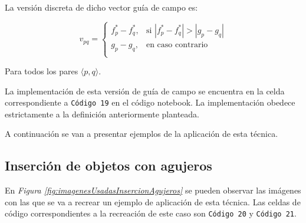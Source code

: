 \documentclass[11pt,twoside,titlepage,a4paper]{article}
\numberwithin{equation}{section} %
\theoremstyle{usual}
\begin{document}
La versión discreta de dicho vector guía de campo es:

\begin{equation}
    v_{pq}=\left\{
                \begin{array}{ll}
                  f^*_p - f^*_q, & \text{si }|f^*_p - f^*_q| > |g_p - g_q|\\
                  g_p - g_q, & \text{en caso contrario}\\
                \end{array}
          \right.
\end{equation}

Para todos los pares $\langle p,q \rangle$.

La implementación de esta versión de guía de campo se encuentra en la celda correspondiente a \texttt{Código 19} en el código notebook. La implementación obedece estrictamente a la definición anteriormente planteada.

A continuación se van a presentar ejemplos de la aplicación de esta técnica.

\subsection{Inserción de objetos con agujeros}

En \textit{Figura \ref{fig:imagenesUsadasInsercionAgujeros}} se pueden observar las imágenes con las que se va a recrear un ejemplo de aplicación de esta técnica. Las celdas de código correspondientes a la recreación de este caso son \texttt{Código 20} y \texttt{Código 21}.
\end{document}
